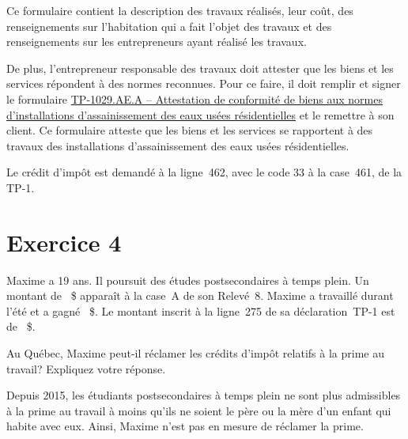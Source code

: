 Ce formulaire contient la description des travaux réalisés, leur coût, des renseignements sur l'habitation qui a fait l'objet des travaux et des renseignements sur les entrepreneurs ayant réalisé les travaux.

De plus, l'entrepreneur responsable des travaux doit attester que les biens et les services répondent à des normes reconnues. Pour ce faire, il doit remplir et signer le formulaire \href{https://www.revenuquebec.ca/documents/fr/formulaires/tp/TP-1029.AE.A(2023-10).pdf}{TP-1029.AE.A -- Attestation de conformité de biens aux normes d'installations d'assainissement des eaux usées résidentielles} et le remettre à son client. Ce formulaire atteste que les biens et les services se rapportent à des travaux des installations d'assainissement des eaux usées résidentielles.

Le crédit d'impôt est demandé à la ligne~462, avec le code 33 à la case~461, de la TP-1.



\section{Exercice 4}
\setcounter{question}{0}
\begin{question}
	Maxime a 19 ans. Il poursuit des études postsecondaires à temps plein. Un montant de ~\$ apparaît à la case~A de son Relevé~8. Maxime a travaillé durant l'été et a gagné ~\$. Le montant inscrit à la ligne~275 de sa déclaration~TP-1 est de ~\$.
	
	Au Québec, Maxime peut-il réclamer les crédits d'impôt relatifs à la prime au travail? Expliquez votre réponse.
\end{question}
Depuis 2015, les étudiants postsecondaires à temps plein ne sont plus admissibles à la prime au travail à moins qu'ils ne soient le père ou la mère d'un enfant qui habite avec eux. Ainsi, Maxime n'est pas en mesure de réclamer la prime.

